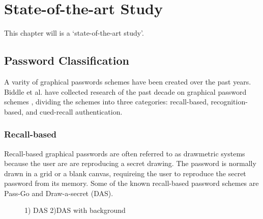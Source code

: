 


\chapter{State-of-the-art Study}

  This chapter will is a `state-of-the-art study'.

\clearpage
  
  \section{Password Classification}

    A varity of graphical passwords schemes have been created over the past years. Biddle et al. have collected research 
    of the past decade on graphical password schemes \cite{Biddle}, dividing the schemes into three categories: recall-based, 
    recognition-based, and cued-recall authentication. 

    \subsection{Recall-based}
      Recall-based graphical passwords are often referred to as drawmetric systems \cite{DeAngeli} because the user are
      are reproducing a secret drawing. The password is normally drawn in a grid or a blank canvas, requireing the
      user to reproduce the secret password from its memory.
      Some of the known recall-based password schemes are Pass-Go and Draw-a-secret (DAS).

      \begin{figure}[H]
        \centering
        \caption{1) DAS 2)DAS with background}
      \end{figure}

